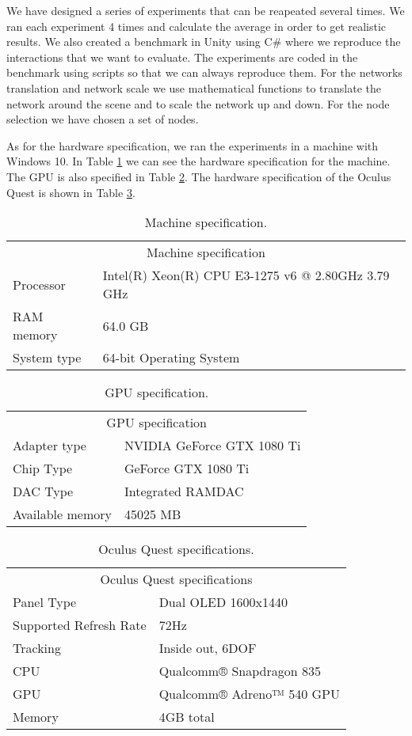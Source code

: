 We have designed a series of experiments that can be reapeated several times. We ran each experiment 4 times and calculate the average in order to get realistic results. We also created a benchmark in Unity using C\# where we reproduce the interactions that we want to evaluate. The experiments are coded in the benchmark using scripts so that we can always reproduce them. For the networks translation and network scale we use mathematical functions to translate the network around the scene and to scale the network up and down. For the node selection we have chosen a set of nodes.

As for the hardware specification, we ran the experiments in a machine with Windows 10. In Table \ref{tab:machine-specs} we can see the hardware specification for the machine. The GPU is also specified in Table \ref{tab:gpu-specs}. The hardware specification of the Oculus Quest is shown in Table \ref{tab:oculus-specs}.

\begin{table}[h!]
\centering
\begin{tabular}{ll}
\multicolumn{2}{c}{Machine specification}                        \\
Processor   & Intel(R) Xeon(R) CPU E3-1275 v6 @ 2.80GHz 3.79 GHz \\
RAM memory  & 64.0 GB                                            \\
System type & 64-bit Operating System
\end{tabular}
\caption{Machine specification.}
\label{tab:machine-specs}
\end{table}

\begin{table}[h!]
\centering
\begin{tabular}{ll}
\multicolumn{2}{c}{GPU specification} \\
Adapter type   & NVIDIA GeForce GTX 1080 Ti \\
Chip Type  &  GeForce GTX 1080 Ti \\
DAC Type & Integrated RAMDAC \\
Available memory & 45025 MB
\end{tabular}
\caption{GPU specification.}
\label{tab:gpu-specs}
\end{table}

\begin{table}[h!]
\centering
\begin{tabular}{ll}
\multicolumn{2}{c}{Oculus Quest specifications} \\
Panel Type   & Dual OLED 1600x1440 \\
Supported Refresh Rate  &  72Hz \\
Tracking & Inside out, 6DOF \\
CPU & Qualcomm® Snapdragon 835 \\
GPU & Qualcomm® Adreno™ 540 GPU \\
Memory & 4GB total
\end{tabular}
\caption{Oculus Quest specifications.}
\label{tab:oculus-specs}
\end{table}

